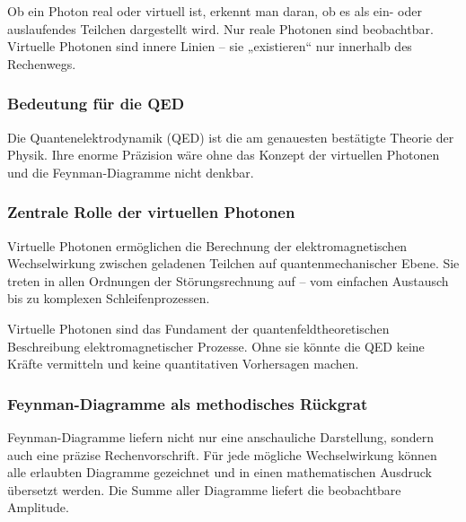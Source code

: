 \begin{tcolorbox}[didaktikbox, title=Reale oder virtuelle Photonen im Diagramm]
	\label{box:Reale oder virtuelle Photonen}
	Ob ein Photon real oder virtuell ist, erkennt man daran, ob es als ein- oder auslaufendes Teilchen dargestellt wird. Nur reale Photonen sind beobachtbar. Virtuelle Photonen sind innere Linien – sie „existieren“ nur innerhalb des Rechenwegs.
\end{tcolorbox}

\subsubsection{Bedeutung für die QED}

Die Quantenelektrodynamik (QED) ist die am genauesten bestätigte Theorie der Physik. Ihre enorme Präzision wäre ohne das Konzept der virtuellen Photonen und die Feynman-Diagramme nicht denkbar.

\subsubsection*{Zentrale Rolle der virtuellen Photonen}
Virtuelle Photonen ermöglichen die Berechnung der elektromagnetischen Wechselwirkung zwischen geladenen Teilchen auf quantenmechanischer Ebene. Sie treten in allen Ordnungen der Störungsrechnung auf – vom einfachen Austausch bis zu komplexen Schleifenprozessen.

\medskip
\begin{tcolorbox}[physikbox, title=Ohne virtuelle Photonen keine QED]
	\label{box:Ohne virtuelle Photonen keine}
	Virtuelle Photonen sind das Fundament der quantenfeldtheoretischen Beschreibung elektromagnetischer Prozesse. Ohne sie könnte die QED keine Kräfte vermitteln und keine quantitativen Vorhersagen machen.
\end{tcolorbox}

\subsubsection*{Feynman-Diagramme als methodisches Rückgrat}
Feynman-Diagramme liefern nicht nur eine anschauliche Darstellung, sondern auch eine präzise Rechenvorschrift. Für jede mögliche Wechselwirkung können alle erlaubten Diagramme gezeichnet und in einen mathematischen Ausdruck übersetzt werden. Die Summe aller Diagramme liefert die beobachtbare Amplitude.

